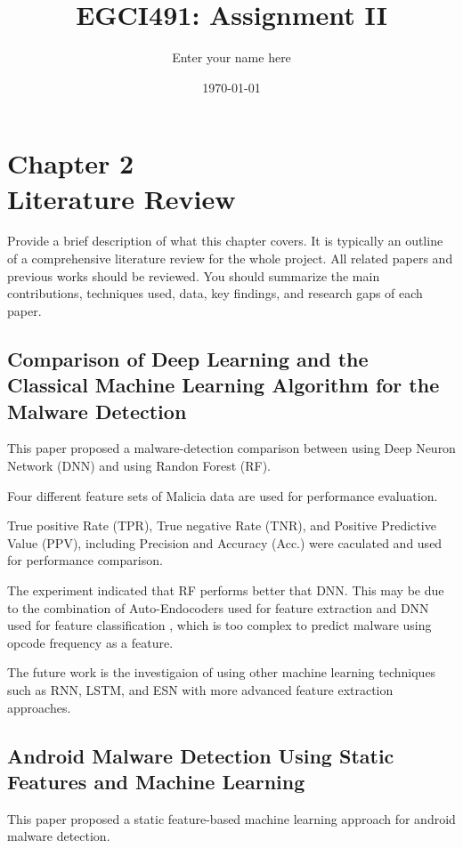 \documentclass[a4paper, 12pt]{report}
\title{EGCI491: Assignment II}
\author{Enter your name here} %
\date{\today}
\begin{document}
	
	\maketitle
		
	\chapter*{\centering Chapter 2 \\  Literature Review}
	
	\hspace{\parindent} 
	Provide a brief description of what this chapter covers. It is typically an outline of a comprehensive literature review for the whole project.  All related papers and previous works should be reviewed. You should summarize the main contributions, techniques used, data, key findings, and research gaps of each paper.
		
	\setcounter{chapter}{2}
	\section{Comparison of Deep Learning and the Classical Machine Learning Algorithm for the Malware Detection \cite{paper_1}}
	This paper proposed a malware-detection comparison  between using Deep Neuron Network (DNN) and using Randon Forest (RF).  
	
	Four different feature sets of Malicia data are used for performance evaluation.  
	
	True positive Rate (TPR), True negative Rate (TNR), and Positive Predictive Value (PPV), including Precision and Accuracy (Acc.) were caculated and used for performance comparison. 
	
	The experiment indicated that RF performs better that DNN.  This may be due to the combination of Auto-Endocoders used for feature extraction and DNN used for feature classification , which is too complex to predict malware using opcode frequency as a feature. 
	
	The future work is the investigaion of using other machine learning techniques such as RNN, LSTM, and ESN with more advanced feature extraction approaches.
	
	\newpage
	\section{Android Malware Detection Using Static Features and Machine Learning \cite{paper_2}}
	This paper proposed a static feature-based machine learning approach for android malware detection. 
	
\end{document}
